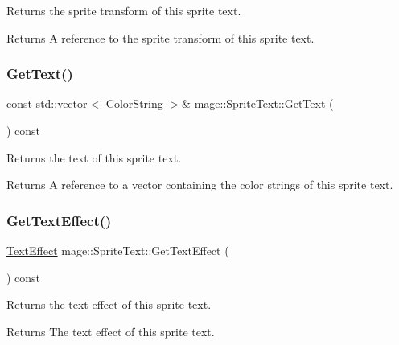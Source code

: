 Returns the sprite transform of this sprite text.

\begin{DoxyReturn}{Returns}
A reference to the sprite transform of this sprite text. 
\end{DoxyReturn}
\hypertarget{classmage_1_1_sprite_text_a035a18c8c388649f38a6a62e3cbcc18a}{}\label{classmage_1_1_sprite_text_a035a18c8c388649f38a6a62e3cbcc18a} 
\subsubsection{\texorpdfstring{Get\+Text()}{GetText()}}
{\footnotesize\ttfamily const std\+::vector$<$ \hyperlink{classmage_1_1_color_string}{Color\+String} $>$\& mage\+::\+Sprite\+Text\+::\+Get\+Text (\begin{DoxyParamCaption}{ }\end{DoxyParamCaption}) const\hspace{0.3cm}{\ttfamily [noexcept]}}

Returns the text of this sprite text.

\begin{DoxyReturn}{Returns}
A reference to a vector containing the color strings of this sprite text. 
\end{DoxyReturn}
\hypertarget{classmage_1_1_sprite_text_a1f5b83df9a7332ac3774a038df169847}{}\label{classmage_1_1_sprite_text_a1f5b83df9a7332ac3774a038df169847} 
\subsubsection{\texorpdfstring{Get\+Text\+Effect()}{GetTextEffect()}}
{\footnotesize\ttfamily \hyperlink{classmage_1_1_sprite_text_a4d3101d037b6fe4247d77b5fbf811dd2}{Text\+Effect} mage\+::\+Sprite\+Text\+::\+Get\+Text\+Effect (\begin{DoxyParamCaption}{ }\end{DoxyParamCaption}) const\hspace{0.3cm}{\ttfamily [noexcept]}}

Returns the text effect of this sprite text.

\begin{DoxyReturn}{Returns}
The text effect of this sprite text. 
\end{DoxyReturn}
\hypertarget{classmage_1_1_sprite_text_a0b8d0df75efa9dd9e666b68db6ee71b5}{}\label{classmage_1_1_sprite_text_a0b8d0df75efa9dd9e666b68db6ee71b5} 
